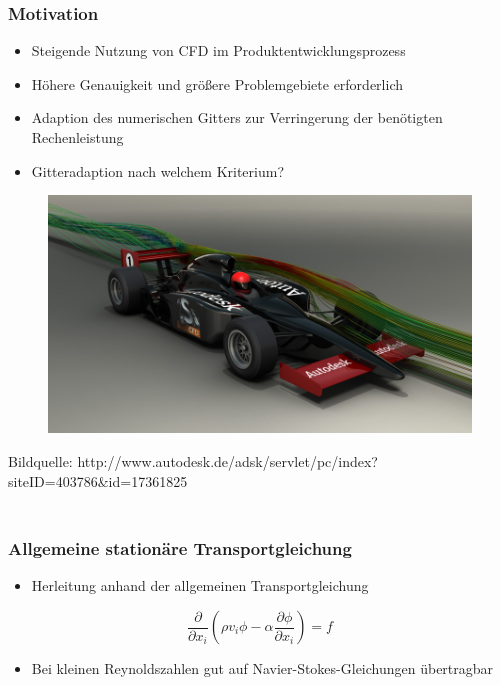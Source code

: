 \documentclass[accentcolor=tud2c,colorbacktitle,inverttitle,landscape,ngerman,presentation,t]{tudbeamer}
\begin{document}
\begin{frame}
  \frametitle{\\Motivation}
  \begin{itemize}
  \item Steigende Nutzung von CFD im Produktentwicklungsprozess
  \item Höhere Genauigkeit und größere Problemgebiete erforderlich
  \item Adaption des numerischen Gitters zur Verringerung der benötigten Rechenleistung
  \item Gitteradaption nach welchem Kriterium?
  \end{itemize}

  \begin{figure}
  \begin{center}
    \includegraphics[scale=0.2]{auto}
  \end{center}
  \end{figure}
  \tiny Bildquelle: http://www.autodesk.de/adsk/servlet/pc/index?siteID=403786\&id=17361825
\end{frame}

\begin{frame}
  \frametitle{\\Allgemeine stationäre Transportgleichung}
    \begin{itemize}
      \item Herleitung anhand der allgemeinen Transportgleichung
  \end{itemize}
  \begin{equation*}
  \frac{\partial}{\partial x_i} \left({\rho v_i \phi
- \alpha \frac{\partial \phi}{\partial x_i} }\right) = f
\label{eq:transportgl}
\end{equation*}
\begin{itemize}
      \item Bei kleinen Reynoldszahlen gut auf Navier-Stokes-Gleichungen übertragbar
  \end{itemize}
\end{frame}
\end{document}
